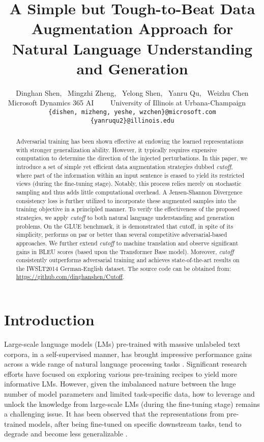 \documentclass[11pt,a4paper]{article}
\title{A Simple but Tough-to-Beat Data Augmentation Approach for \\ 
    Natural Language Understanding and Generation}
\author{Dinghan Shen, ~Mingzhi Zheng, ~Yelong Shen, ~Yanru Qu, ~Weizhu Chen \\
	\smallskip 
	 Microsoft Dynamics 365 AI~~~~
	 University of Illinois at Urbana-Champaign~~~ \\
	\smallskip
	 {\tt \{dishen, mizheng, yeshe, wzchen\}@microsoft.com} \\
	 {\tt \{yanruqu2\}@illinois.edu} \\
  }
\begin{document}
\maketitle

\begin{abstract}
Adversarial training has been shown effective at endowing the learned representations with stronger generalization ability. However, it typically requires expensive computation to determine the direction of the injected perturbations. In this paper, we introduce a set of simple yet efficient data augmentation strategies dubbed \emph{cutoff}, where part of the information within an input sentence is erased to yield its restricted views (during the fine-tuning stage). 
Notably, this process relies merely on stochastic sampling and thus adds little computational overhead.
A Jensen-Shannon Divergence consistency loss is further utilized to incorporate these augmented samples into the training objective in a principled manner.
To verify the effectiveness of the proposed strategies, we apply \emph{cutoff} to both natural language understanding and generation problems. 
On the GLUE benchmark, it is demonstrated that cutoff, in spite of its simplicity, performs on par or better than several competitive adversarial-based approaches.
We further extend \emph{cutoff} to machine translation and observe significant gains in BLEU scores (based upon the Transformer Base model). Moreover, \emph{cutoff} consistently outperforms adversarial training and achieves state-of-the-art results on the IWSLT2014 German-English dataset.
The source code can be obtained from: \url{https://github.com/dinghanshen/Cutoff}.
\end{abstract}

\section{Introduction} 
Large-scale language models (LMs) pre-trained with massive unlabeled text corpora, in a self-supervised manner, has brought impressive performance gains across a wide range of natural language processing tasks \cite{devlin2018bert, liu2019roberta, yang2019xlnet, joshi2019spanbert, sun2019ernie, clark2019electra, lewis2019bart, bao2020unilmv2, he2020deberta}. Significant research efforts have focused on exploring various pre-training recipes to yield more informative LMs. However, given the imbalanced nature between the huge number of model parameters and limited task-specific data, how to leverage and unlock the knowledge from large-scale LMs (during the fine-tuning stage) remains a challenging issue. It has been observed that the representations from pre-trained models, after being fine-tuned on specific downstream tasks, tend to degrade and become less generalizable \cite{zhu2019freelb, jiang2019smart, aghajanyan2020better}.
\end{document}
